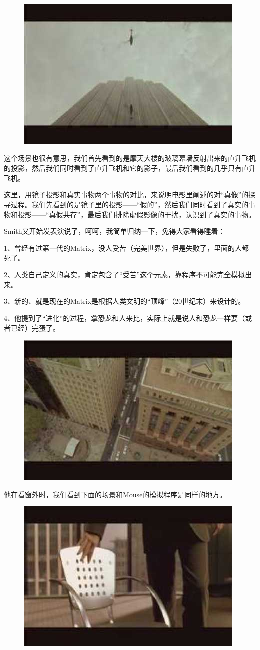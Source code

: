 \documentclass[UTF8]{ctexart}
\begin{document}
\begin{figure}[htb]
\centering
\includegraphics[width=0.5\linewidth]{fig/read_Matrix-60}
\end{figure}

这个场景也很有意思，我们首先看到的是摩天大楼的玻璃幕墙反射出来的直升飞机的投影，然后我们同时看到了直升飞机和它的影子，最后我们看到的几乎只有直升飞机。

这里，用镜子投影和真实事物两个事物的对比，来说明电影里阐述的对“真像”的探寻过程。我们先看到的是镜子里的投影——“假的”，然后我们同时看到了真实的事物和投影——“真假共存”，最后我们排除虚假影像的干扰，认识到了真实的事物。

Smith又开始发表演说了，呵呵，我简单归纳一下，免得大家看得睡着：

1、曾经有过第一代的Matrix，没人受苦（完美世界），但是失败了，里面的人都死了。

2、人类自己定义的真实，肯定包含了“受苦”这个元素，靠程序不可能完全模拟出来。

3、新的、就是现在的Matrix是根据人类文明的“顶峰”（20世纪末）来设计的。

4、他提到了“进化”的过程，拿恐龙和人来比，实际上就是说人和恐龙一样要（或者已经）完蛋了。

\begin{figure}[htb]
\centering
\includegraphics[width=0.5\linewidth]{fig/read_Matrix-61}
\end{figure}

他在看窗外时，我们看到下面的场景和Mouse的模拟程序是同样的地方。

\begin{figure}[htb]
\centering
\includegraphics[width=0.5\linewidth]{fig/read_Matrix-62}
\end{figure}
\end{document}
